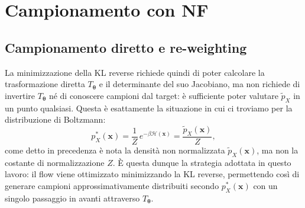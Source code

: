 \section{Campionamento con NF}
\label{sec:camp_nf}
\subsection{Campionamento diretto e re-weighting} 
\label{subsec:boltzmann_gen}
La minimizzazione della KL reverse richiede quindi di poter calcolare la trasformazione diretta $T_{\boldsymbol{\theta}}$ e il determinante del suo Jacobiano, ma non richiede di invertire $T_{\boldsymbol{\theta}}$ né di conoscere campioni dal target: è sufficiente poter valutare $\tilde{p}_X$ in un punto qualsiasi. Questa è esattamente la situazione in cui ci troviamo per la distribuzione di Boltzmann:
\begin{equation}
    p_X^*(\mathbf{x}) = \frac{1}{Z}\, e^{-\beta \mathcal{H}(\mathbf{x})} = \frac{\tilde{p}_X(\mathbf{x})}{Z},
\end{equation}
come detto in precedenza è nota la densità non normalizzata $\tilde{p}_X(\mathbf{x})$, ma non la costante di normalizzazione $Z$. \`E questa dunque la strategia adottata in questo lavoro: il flow viene ottimizzato minimizzando la KL reverse, permettendo così  di generare campioni approssimativamente distribuiti secondo $p_X^*(\mathbf{x})$ con un singolo passaggio in avanti attraverso $T_{\boldsymbol{\theta}}$.

